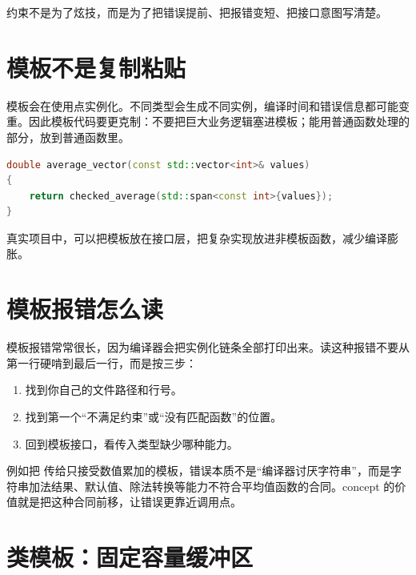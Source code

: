 约束不是为了炫技，而是为了把错误提前、把报错变短、把接口意图写清楚。

\section{模板不是复制粘贴}

模板会在使用点实例化。不同类型会生成不同实例，编译时间和错误信息都可能变重。因此模板代码要更克制：不要把巨大业务逻辑塞进模板；能用普通函数处理的部分，放到普通函数里。

\begin{lstlisting}[language=C++,caption={模板只负责薄薄的类型适配}]
double average_vector(const std::vector<int>& values)
{
    return checked_average(std::span<const int>{values});
}
\end{lstlisting}

真实项目中，可以把模板放在接口层，把复杂实现放进非模板函数，减少编译膨胀。

\section{模板报错怎么读}

模板报错常常很长，因为编译器会把实例化链条全部打印出来。读这种报错不要从第一行硬啃到最后一行，而是按三步：

\begin{enumerate}
  \item 找到你自己的文件路径和行号。
  \item 找到第一个“不满足约束”或“没有匹配函数”的位置。
  \item 回到模板接口，看传入类型缺少哪种能力。
\end{enumerate}

例如把  传给只接受数值累加的模板，错误本质不是“编译器讨厌字符串”，而是字符串加法结果、默认值、除法转换等能力不符合平均值函数的合同。concept 的价值就是把这种合同前移，让错误更靠近调用点。

\section{类模板：固定容量缓冲区}


